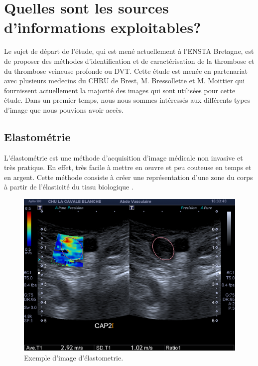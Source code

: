 \chapter{Quelles sont les sources d'informations exploitables?}


Le sujet de départ de l'étude, qui est mené actuellement à l'ENSTA Bretagne, est de proposer des méthodes d'identification et de caractérisation de la thrombose et du thrombose veineuse profonde ou DVT. Cette étude est menée en partenariat avec plusieurs medecins du CHRU de Brest, M. Bressollette et M. Moittier qui fournissent actuellement la majorité des images qui sont utilisées pour cette étude. Dans un premier temps, nous nous sommes intéressés aux différents types d'image que nous pouvions avoir accès. 


\section{Elastométrie}

L'élastométrie est une méthode d'acquisition d'image médicale non invasive et très pratique. En effet, très facile à mettre en œuvre et peu couteuse en temps et en argent. Cette méthode consiste à créer une représentation d'une zone du corps à partir de l'élasticité du tissu biologique \cite{ophir1991elastography}.

\begin{figure}[H]
\centering
    \includegraphics[scale=0.3,angle=0]{Images/ExempleElastometrie.png}
    \caption{Exemple d'image d'élastometrie.}
    \label{fig:ExempleElastometrie}
\end{figure}

